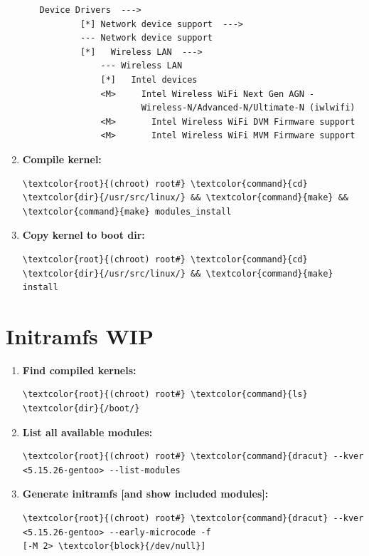 \documentclass[10pt, a4paper, onecolumn, oneside, titlepage, openany]{book}
\begin{document}
\begin{enumerate}
\begin{enumerate}
\begin{Verbatim}[commandchars=\\\{\}]
Device Drivers  --->
        [*] Network device support  --->
        --- Network device support
        [*]   Wireless LAN  --->
            --- Wireless LAN
            [*]   Intel devices
            <M>     Intel Wireless WiFi Next Gen AGN -
                    Wireless-N/Advanced-N/Ultimate-N (iwlwifi)
            <M>       Intel Wireless WiFi DVM Firmware support
            <M>       Intel Wireless WiFi MVM Firmware support
\end{Verbatim}
    \end{enumerate}
    \item \textbf{Compile kernel:}
\begin{Verbatim}[commandchars=\\\{\}]
\textcolor{root}{(chroot) root#} \textcolor{command}{cd} \textcolor{dir}{/usr/src/linux/} && \textcolor{command}{make} && \textcolor{command}{make} modules_install
\end{Verbatim}
    \item \textbf{Copy kernel to boot dir:}
\begin{Verbatim}[commandchars=\\\{\}]
\textcolor{root}{(chroot) root#} \textcolor{command}{cd} \textcolor{dir}{/usr/src/linux/} && \textcolor{command}{make} install
\end{Verbatim}
\end{enumerate}

\section{Initramfs WIP}
\begin{enumerate}
    \item \textbf{Find compiled kernels:}
\begin{Verbatim}[commandchars=\\\{\}]
\textcolor{root}{(chroot) root#} \textcolor{command}{ls} \textcolor{dir}{/boot/}
\end{Verbatim}
    \item \textbf{List all available modules:}
\begin{Verbatim}[commandchars=\\\{\}]
\textcolor{root}{(chroot) root#} \textcolor{command}{dracut} --kver <5.15.26-gentoo> --list-modules
\end{Verbatim}
    \item \textbf{Generate initramfs [and show included modules]:}
\begin{Verbatim}[commandchars=\\\{\}]
\textcolor{root}{(chroot) root#} \textcolor{command}{dracut} --kver <5.15.26-gentoo> --early-microcode -f
[-M 2> \textcolor{block}{/dev/null}]
\end{Verbatim}
\end{enumerate}
\end{document}
